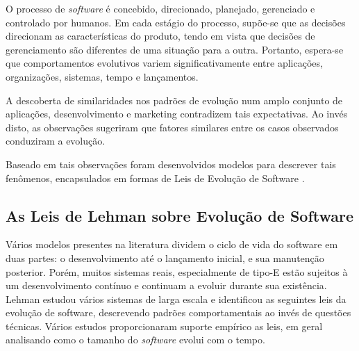 O processo de \textit{software} é concebido, direcionado, planejado, gerenciado e controlado por humanos. Em cada estágio do processo, supõe-se que as decisões direcionam as características do produto, tendo em vista que decisões de gerenciamento são diferentes de uma situação para a outra. Portanto, espera-se que comportamentos evolutivos variem significativamente entre aplicações, organizações, sistemas, tempo e lançamentos.

A descoberta de similaridades nos padrões de evolução num amplo conjunto de aplicações, desenvolvimento e marketing contradizem tais expectativas. Ao invés disto, as observações sugeriram que fatores similares entre os casos observados conduziram a evolução. 
 
Baseado em tais observações foram desenvolvidos modelos para descrever tais fenômenos, encapsulados em formas de Leis de Evolução de Software \cite{lehman1985program}.
\subsection{As Leis de Lehman sobre Evolução de Software} \label{sec:lehmalaws}

Vários modelos presentes na literatura dividem o ciclo de vida do software em duas partes: o desenvolvimento até o lançamento inicial, e sua manutenção posterior. Porém, muitos sistemas reais, especialmente de tipo-E estão sujeitos à um desenvolvimento contínuo e continuam a evoluir durante sua existência. 
Lehman estudou vários sistemas de larga escala e identificou as seguintes leis da evolução de software, descrevendo padrões comportamentais ao invés de questões técnicas\cite{lehman1979understanding,lehman1996laws}. Vários estudos proporcionaram suporte empírico as leis, em geral analisando como o tamanho do \textit{software} evolui com o tempo.

